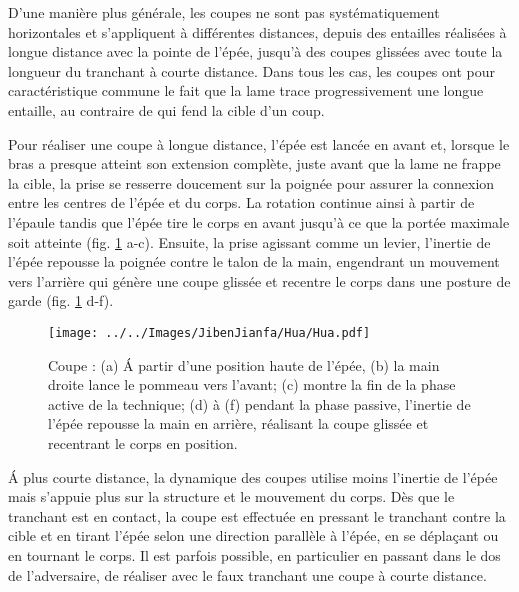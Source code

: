 D'une manière plus générale, les coupes \Hua{} ne sont pas systématiquement horizontales et s'appliquent à différentes distances, depuis des entailles réalisées à longue distance avec la pointe de l'épée, jusqu'à des coupes glissées avec toute la longueur du tranchant à courte distance. Dans tous les cas, les coupes \Hua{} ont pour caractéristique commune le fait que la lame trace progressivement une longue entaille, au contraire de \Pi{} qui fend la cible d'un coup. 

Pour réaliser une coupe \Hua{} à longue distance, l'épée est lancée en avant et, lorsque le bras a presque atteint son extension complète, juste avant que la lame ne frappe la cible, la prise se resserre doucement sur la poignée pour assurer la connexion entre les centres de l'épée et du corps. La rotation continue ainsi à partir de l'épaule tandis que l'épée tire le corps en avant jusqu'à ce que la portée maximale soit atteinte (fig. \ref{fig:hua_cut} a-c). Ensuite, la prise agissant comme un levier, l'inertie de l'épée repousse la poignée contre le talon de la main, engendrant un mouvement vers l'arrière qui génère une coupe glissée et recentre le corps dans une posture de garde (fig. \ref{fig:hua_cut} d-f). 

\begin{figure}[ht]
\centering
	\texttt{[image: ../../Images/JibenJianfa/Hua/Hua.pdf]}
	\caption[Coupe \Hua{}]{Coupe \Hua{} : (a) \'{A} partir d'une position haute de l'épée, (b) la main droite lance le pommeau vers l'avant; (c) montre la fin de la phase active de la technique; (d) à (f) pendant la phase passive, l'inertie de l'épée repousse la main en arrière, réalisant la coupe glissée et recentrant le corps en position.}
	\label{fig:hua_cut}
\end{figure}

\'{A} plus courte distance, la dynamique des coupes \Hua{} utilise moins l'inertie de l'épée mais s'appuie plus sur la structure et le mouvement du corps. Dès que le tranchant est en contact, la coupe est effectuée en pressant le tranchant contre la cible et en tirant l'épée selon une direction parallèle à l'épée, en se déplaçant ou en tournant le corps. Il est parfois possible, en particulier en passant dans le dos de l'adversaire, de réaliser avec le faux tranchant une coupe \Hua{} à courte distance.

